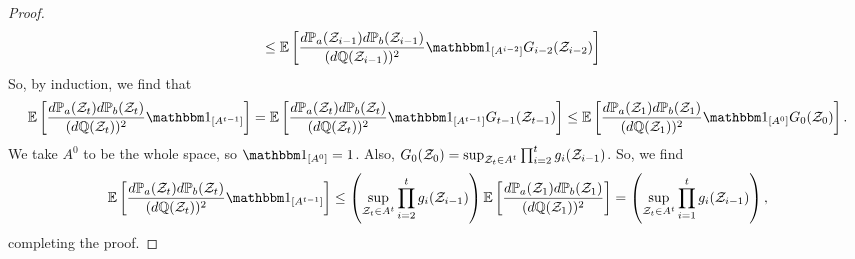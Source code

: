 \begin{proof}
\begin{align*}
        &\leq \E\left[
            \frac{d\bbP_a(\cZ_{i-1}) d\bbP_b(\cZ_{i-1})}{(d\bbQ(\cZ_{i-1}))^2}
            \mathbbm1_{[A^{i-2}]}
            G_{i-2}(\cZ_{i-2})\right]
    \end{align*}
So, by induction, we find that
\[
    \E\left[
        \frac{d\bbP_a(\cZ_t) d\bbP_b(\cZ_t)}{(d\bbQ(\cZ_t))^2}
        \mathbbm1_{[A^{t-1}]}
    \right]
    = \E\left[
        \frac{d\bbP_a(\cZ_t) d\bbP_b(\cZ_t)}{(d\bbQ(\cZ_t))^2}
        \mathbbm1_{[A^{t-1}]}
        G_{t-1}(\cZ_{t-1})
    \right]
    \leq \E\left[
        \frac{d\bbP_a(\cZ_1) d\bbP_b(\cZ_1)}{(d\bbQ(\cZ_1))^2}
        \mathbbm1_{[A^{0}]}
        G_{0}(\cZ_{0})
    \right].
\]
We take \(A^{0}\) to be the whole space, so \(\mathbbm1_{[A^{0}]}=1\).
Also, \(G_{0}({\mathcal Z}_{0}) = \sup_{{\mathcal Z}_t\in A^t} \prod_{i=2}^t g_i({\mathcal Z}_{i-1})\).
So, we find
\[
    \E\left[
        \frac{d\bbP_a(\cZ_t) d\bbP_b(\cZ_t)}{(d\bbQ(\cZ_t))^2}
        \mathbbm1_{[A^{t-1}]}
    \right]
    \leq 
    \left(\sup_{\cZ_t\in A^t} \prod_{i=2}^t g_i(\cZ_{i-1})\right)
    \E\left[\frac{d\bbP_a(\cZ_1) d\bbP_b(\cZ_1)}{(d\bbQ(\cZ_1))^2}\right]
    = \left(\sup_{\cZ_t\in A^t} \prod_{i=1}^t g_i(\cZ_{i-1})\right),
\]
completing the proof.
\end{proof}



